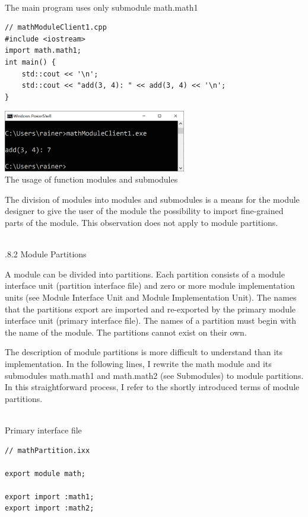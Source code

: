 \hspace*{\fill} \\ %
\noindent
The main program uses only submodule math.math1
\begin{lstlisting}[style=styleCXX]
// mathModuleClient1.cpp
#include <iostream>
import math.math1;
int main() {
	std::cout << '\n';
	std::cout << "add(3, 4): " << add(3, 4) << '\n';
}
\end{lstlisting}

\begin{center}
\includegraphics[width=0.6\textwidth]{content/3/chapter4/images/22.png}\\
The usage of function modules and submodules
\end{center}

The division of modules into modules and submodules is a means for the module designer to give the user of the module the possibility to import fine-grained parts of the module. This observation does not apply to module partitions.

\hspace*{\fill} \\ %
.8.2\hspace{0.2cm} Module Partitions

A module can be divided into partitions. Each partition consists of a module interface unit (partition interface file) and zero or more module implementation units (see Module Interface Unit and Module Implementation Unit). The names that the partitions export are imported and re-exported by the primary module interface unit (primary interface file). The names of a partition must begin with the name of the module. The partitions cannot exist on their own.

The description of module partitions is more difficult to understand than its implementation. In the following lines, I rewrite the math module and its submodules math.math1 and math.math2 (see Submodules) to module partitions. In this straightforward process, I refer to the shortly introduced terms of module partitions.

\hspace*{\fill} \\ %
\noindent
Primary interface file
\begin{lstlisting}[style=styleCXX]
// mathPartition.ixx

export module math;

export import :math1;
export import :math2;
\end{lstlisting}

